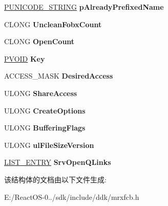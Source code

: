 \begin{DoxyCompactItemize}
\hyperlink{struct___u_n_i_c_o_d_e___s_t_r_i_n_g}{P\+U\+N\+I\+C\+O\+D\+E\+\_\+\+S\+T\+R\+I\+NG} {\bfseries p\+Already\+Prefixed\+Name}
\item 
\mbox{\label{struct___m_r_x___s_r_v___o_p_e_n___ac58a360f50699ed7e4cdf5b22658095f}} 
C\+L\+O\+NG {\bfseries Unclean\+Fobx\+Count}
\item 
\mbox{\label{struct___m_r_x___s_r_v___o_p_e_n___ac9cd49e7a0e36abe6dffc54c5ed444f3}} 
C\+L\+O\+NG {\bfseries Open\+Count}
\item 
\mbox{\label{struct___m_r_x___s_r_v___o_p_e_n___a7706fdfdf0f8eba732265e69bab53fd0}} 
\hyperlink{interfacevoid}{P\+V\+O\+ID} {\bfseries Key}
\item 
\mbox{\label{struct___m_r_x___s_r_v___o_p_e_n___a59ec2014ffdec3b471a0225ed809379d}} 
A\+C\+C\+E\+S\+S\+\_\+\+M\+A\+SK {\bfseries Desired\+Access}
\item 
\mbox{\label{struct___m_r_x___s_r_v___o_p_e_n___ae55c6339ea6f9833b07c82eedefde544}} 
U\+L\+O\+NG {\bfseries Share\+Access}
\item 
\mbox{\label{struct___m_r_x___s_r_v___o_p_e_n___ab2d02b76ea74a5e240eb0b7effb73752}} 
U\+L\+O\+NG {\bfseries Create\+Options}
\item 
\mbox{\label{struct___m_r_x___s_r_v___o_p_e_n___adc6e49e5d487387988e7d9acda836844}} 
U\+L\+O\+NG {\bfseries Buffering\+Flags}
\item 
\mbox{\label{struct___m_r_x___s_r_v___o_p_e_n___a4df9a9bc99058f8ce2fa343cb7dd7cd6}} 
U\+L\+O\+NG {\bfseries ul\+File\+Size\+Version}
\item 
\mbox{\label{struct___m_r_x___s_r_v___o_p_e_n___a713e76e723a4d23ce3588cc0bef97f3a}} 
\hyperlink{struct___l_i_s_t___e_n_t_r_y}{L\+I\+S\+T\+\_\+\+E\+N\+T\+RY} {\bfseries Srv\+Open\+Q\+Links}
\end{DoxyCompactItemize}


该结构体的文档由以下文件生成\+:\begin{DoxyCompactItemize}
\item 
E\+:/\+React\+O\+S-\/0../sdk/include/ddk/mrxfcb.\+h\end{DoxyCompactItemize}
